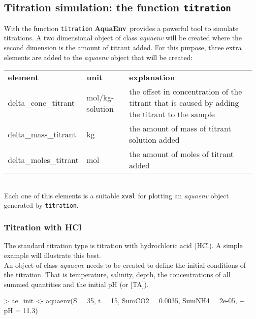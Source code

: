\documentclass[article,nojss]{jss}
\newcommand{\aq}{\textbf{\textsf{AquaEnv}}}
\begin{document}
\subsection{Titration simulation: the function \texttt{titration}}

With the function \texttt{titration} \aq$\,$ provides a powerful tool to simulate titrations. A two dimensional object of class
\textit{aquaenv} will be created where the second dimension is the amount of titrant added.
For this purpose, three extra elements are added to the \textit{aquaenv} object that will be created:\\

\noindent
\begin{tabular}{llp{}} \hline
\textbf{element}    & \textbf{unit}       & \textbf{explanation}\\
delta\_conc\_titrant  & mol/kg-solution   & the offset in concentration of the titrant that is caused by adding the titrant to the sample\\
delta\_mass\_titrant  & kg                & the amount of mass of titrant solution added\\ 
delta\_moles\_titrant & mol               & the amount of moles of titrant added\\
\end{tabular}\\

\noindent
Each one of this elements is a suitable \texttt{xval} for plotting an \textit{aquaenv} object generated by \texttt{titration}.

\subsubsection{Titration with HCl}
The standard titration type is titration with hydrochloric acid (HCl). A simple example will illustrate this best.\\

\noindent
An object of class \textit{aquaenv} needs to be created to define the initial conditions of the titration. That is
temperature, salinity, depth, the concentrations of all summed quantities and the initial pH (or [TA]).

\begin{Schunk}
\begin{Sinput}
> ae_init <- aquaenv(S = 35, t = 15, SumCO2 = 0.0035, SumNH4 = 2e-05, 
+     pH = 11.3)
\end{Sinput}
\end{Schunk}
\end{document}

